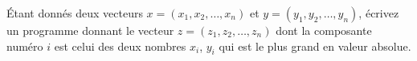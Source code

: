 \begin{exercice}\label{exoSC_serie5-0004}

	Étant donnés deux vecteurs $x=(x_1,x_2,\ldots,x_n)$ et $y=(y_1,y_2,\ldots,y_n)$, écrivez un programme donnant le vecteur $z=(z_1,z_2,\ldots,z_n)$ dont la composante numéro $i$ est celui des deux nombres $x_i$, $y_i$ qui est le plus grand en valeur absolue.

\end{exercice}
